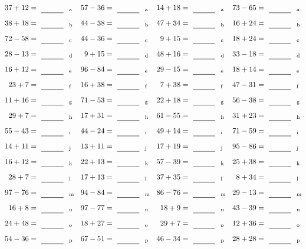 \documentclass
[
  draft    = true,
  fontsize = 11pt,
  parskip  = half-
]
{scrartcl}
\begin{document}
\clearpage
\begin{align*}
    \pline{37+12}&=\rline{a}
  & \pline{57-36}&=\rline{a}
  & \pline{14+18}&=\rline{a}
  & \pline{73-65}&=\rline{a} \\[1ex]
    \pline{38+18}&=\rline{b}
  & \pline{44-38}&=\rline{b}
  & \pline{47+34}&=\rline{b}
  & \pline{16+24}&=\rline{b} \\[1ex]
    \pline{72-58}&=\rline{c}
  & \pline{44-36}&=\rline{c}
  & \pline{9+15}&=\rline{c}
  & \pline{18+24}&=\rline{c} \\[1ex]
    \pline{28-13}&=\rline{d}
  & \pline{9+15}&=\rline{d}
  & \pline{48+16}&=\rline{d}
  & \pline{33-18}&=\rline{d} \\[1ex]
    \pline{16+12}&=\rline{e}
  & \pline{96-84}&=\rline{e}
  & \pline{29-15}&=\rline{e}
  & \pline{18+14}&=\rline{e} \\[1ex]
    \pline{23+7}&=\rline{f}
  & \pline{16+38}&=\rline{f}
  & \pline{7+38}&=\rline{f}
  & \pline{47-31}&=\rline{f} \\[1ex]
    \pline{11+16}&=\rline{g}
  & \pline{71-53}&=\rline{g}
  & \pline{22+18}&=\rline{g}
  & \pline{56-38}&=\rline{g} \\[1ex]
    \pline{29+7}&=\rline{h}
  & \pline{17+31}&=\rline{h}
  & \pline{61-55}&=\rline{h}
  & \pline{31+23}&=\rline{h} \\[1ex]
    \pline{55-43}&=\rline{i}
  & \pline{44-24}&=\rline{i}
  & \pline{49+14}&=\rline{i}
  & \pline{71-59}&=\rline{i} \\[1ex]
    \pline{14+11}&=\rline{j}
  & \pline{13+11}&=\rline{j}
  & \pline{17+19}&=\rline{j}
  & \pline{95-86}&=\rline{j} \\[1ex]
    \pline{16+12}&=\rline{k}
  & \pline{22+13}&=\rline{k}
  & \pline{57-39}&=\rline{k}
  & \pline{25+38}&=\rline{k} \\[1ex]
    \pline{28+7}&=\rline{l}
  & \pline{17+13}&=\rline{l}
  & \pline{37+35}&=\rline{l}
  & \pline{8+34}&=\rline{l} \\[1ex]
    \pline{97-76}&=\rline{m}
  & \pline{94-84}&=\rline{m}
  & \pline{86-76}&=\rline{m}
  & \pline{29-13}&=\rline{m} \\[1ex]
    \pline{16+8}&=\rline{n}
  & \pline{97-77}&=\rline{n}
  & \pline{18+9}&=\rline{n}
  & \pline{43-39}&=\rline{n} \\[1ex]
    \pline{24+48}&=\rline{o}
  & \pline{18+27}&=\rline{o}
  & \pline{29+7}&=\rline{o}
  & \pline{12+36}&=\rline{o} \\[1ex]
    \pline{54-36}&=\rline{p}
  & \pline{67-51}&=\rline{p}
  & \pline{46-34}&=\rline{p}
  & \pline{28+28}&=\rline{p}
\end{align*}
\end{document}
